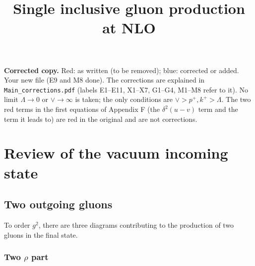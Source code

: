 \documentclass[aps,prd,amsmath,amssymb,nofootinbib]{revtex4-2}
\title{Single inclusive gluon production at NLO}
\numberwithin{equation}{section}
\begin{document}
\tableofcontents
{\color{blue}\noindent\textbf{Corrected copy.} Red: as written (to be removed); blue: corrected or added.
Your new file (E9 and M8 done). The corrections are explained in \texttt{Main\_corrections.pdf} (labels E1--E11, X1--X7, G1--G4, M1--M8 refer to it).
No limit $\Lambda\to0$ or $\vee\to\infty$ is taken; the only conditions are $\vee>p^+,k^+>\Lambda$. The two red terms in the first equations of Appendix F (the $\delta^2(u-v)$ term and the term it leads to) are red in the original and are not corrections.}


\section{Review of the vacuum incoming state}\label{sec:vac}
\subsection{Two outgoing gluons}
To order $g^2$, there are three  diagrams contributing to the production of two gluons in the final state.

\subsubsection{Two $\rho$ part}
\end{document}
